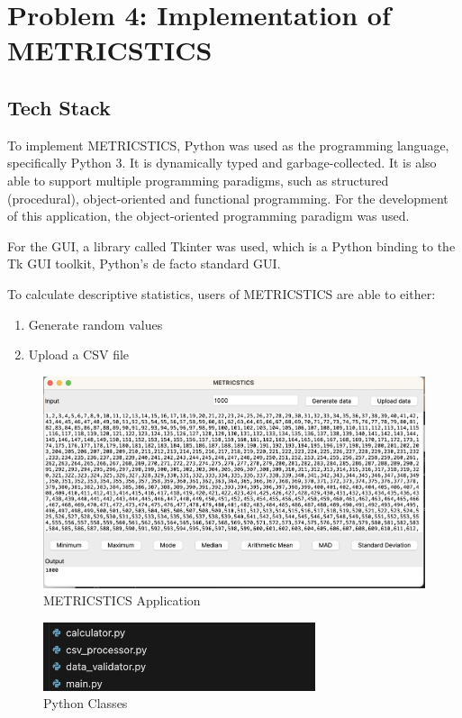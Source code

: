 \section{Problem 4: Implementation of METRICSTICS}

\subsection{Tech Stack}
To implement METRICSTICS, Python was used as the programming language, specifically Python 3. It is dynamically typed and garbage-collected. It is also able to support multiple programming paradigms, such as structured (procedural), object-oriented and functional programming. \cite{python} For the development of this application, the object-oriented programming paradigm was used.

For the GUI, a library called Tkinter was used, which is a Python binding to the Tk GUI toolkit, Python's de facto standard GUI. \cite{tkinter}

To calculate descriptive statistics, users of METRICSTICS are able to either:
\begin{enumerate}
    \item Generate random values
    \item Upload a CSV file
\end{enumerate}

\begin{figure}[!htb]
    \begin{center}
    \includegraphics[width=12cm]{images/gui.png} %
    \end{center}
    \caption{METRICSTICS Application}
\end{figure}

\begin{figure}[ht]
    \begin{center}
    \includegraphics[width=8cm]{images/pythonclasses.png} %
    \end{center}
    \caption{Python Classes}
\end{figure}

